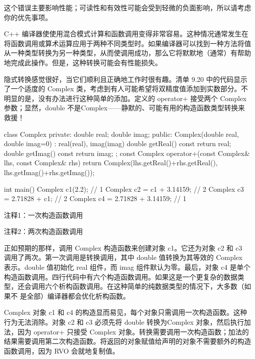 这个错误主要影响性能；可读性和有效性可能会受到轻微的负面影响，所以请考虑你的优先事项。

C++ 编译器使使用混合模式计算和函数调用变得非常容易。这种情况通常发生在将函数调用或算术运算应用于两种不同类型时。如果编译器可以找到一种方法将值从一种类型转换为另一种类型，从而使调用成功，那么它将默默地（通常）有帮助地完成此操作。但是，这种转换可能会有性能损失。


隐式转换感觉很好，当它们顺利且正确地工作时很有趣。清单 9.20 中的代码显示了一个适度的 Complex 类，考虑到有人可能希望将双精度值添加到实数部分。不明显的是，没有办法进行这种简单的添加。定义的 operator+ 接受两个 Complex 参数；显然，double 不是Complex——静默的、可能有用的构造函数类型转换来救援！


\begin{cpp}
class Complex {
private:
  double real;
  double imag;
public:
  Complex(double real, double imag=0) : real(real), imag(imag) {}
  double getReal() const { return real; }
  double getImag() const { return imag; }
};
const Complex operator+(const Complex& lhs, const Complex& rhs) {
  return Complex(lhs.getReal()+rhs.getReal(), lhs.getImag()+rhs.getImag());
}

int main() {
  Complex c1(2.2); // 1
  Complex c2 = c1 + 3.14159; // 2
  Complex c3 = 2.71828 + c1; // 2
  Complex c4 = 2.71828 + 3.14159; // 1
}
\end{cpp}

{\footnotesize
注释1：一次构造函数调用

注释2：两次构造函数调用
}

正如预期的那样，调用 Complex 构造函数来创建对象 c1。它还为对象 c2 和 c3 调用了两次。第一次调用是转换调用，其中 double 值转换为其等效的 Complex 表示。double 值初始化 real 组件，而 imag 组件默认为零。最后，对象 c4 是单个构造函数调用。四行代码中有六个构造函数调用。如果这是一个更复杂的数据类型，还会调用六个析构函数调用。在这种简单的纯数据类型的情况下，大多数（如果不 是全部）编译器都会优化析构函数。


Complex 对象 c1 和 c4 的构造显而易见，每个对象只需调用一次构造函数。这种行为无法消除。对象 c2 和 c3 必须先将 double 转换为Complex 对象，然后执行加法，因为 operator+ 只接受 Complex 对象。转换需要调用一次构造函数；加法的结果需要调用第二次构造函数。将返回的对象赋值给声明的对象不需要额外的构造函数调用，因为 RVO 会就地复制值。

